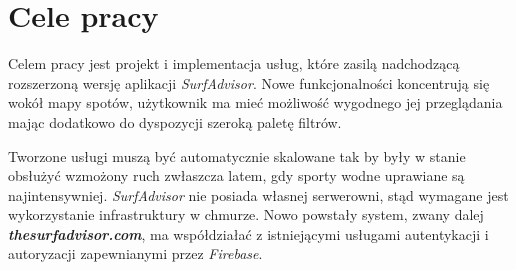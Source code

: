 \section{Cele pracy}
Celem pracy jest projekt i implementacja usług, które zasilą nadchodzącą rozszerzoną wersję aplikacji \emph{SurfAdvisor}.
Nowe funkcjonalności koncentrują się wokół mapy spotów, użytkownik ma mieć możliwość wygodnego jej przeglądania mając dodatkowo do dyspozycji szeroką paletę filtrów.

Tworzone usługi muszą być automatycznie skalowane tak by były w stanie obsłużyć wzmożony ruch zwłaszcza latem, gdy sporty wodne uprawiane są najintensywniej.
\emph{SurfAdvisor} nie posiada własnej serwerowni, stąd wymagane jest wykorzystanie infrastruktury w chmurze.
Nowo powstały system, zwany dalej \textbf{\emph{thesurfadvisor.com}}, ma współdziałać z istniejącymi usługami autentykacji i autoryzacji zapewnianymi przez \emph{Firebase}.

